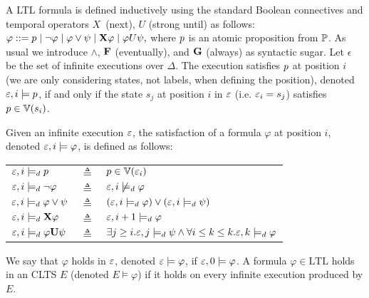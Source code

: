 

A LTL formula is defined inductively using the standard Boolean connectives and temporal operators $X$~(next), $U$ (strong until) as follows: 
$\varphi ::= {p} \mid \neg \varphi \mid \varphi \vee \psi \mid {\bf X} \varphi \mid \varphi U \psi,$
where ${p}$ is an atomic proposition from ${\mathbb{P}}$. 
As usual we introduce $\wedge$, ${\bf F}$ (eventually), and ${\bf G}$ (always) as syntactic sugar. 
Let $\epsilon$ be the set of infinite executions over $\Delta$.
The execution \executionDef satisfies ${p}$ at position $i$ (we are only considering states, not labels, when defining the position), denoted ${\varepsilon},i \models {p}$, if and only if the state $s_j$ at position $i$ in ${\varepsilon}$ (i.e. ${\varepsilon}_i = s_j$)  satisfies ${p} \in {\mathbb{V}}(s_i)$.


Given an infinite execution ${\varepsilon}$, the satisfaction of a formula $\varphi$ at position $i$, denoted ${\varepsilon},i\models\varphi$, is defined as follows:

\begin{tabular}{ l c l }
${\varepsilon}, i \models_d {p}$ & $\triangleq$ & ${p} \in {\mathbb{V}}({\varepsilon}_i)$\\
${\varepsilon}, i \models_d \neg \varphi$ & $\triangleq$ & ${\varepsilon}, i \not\models_d \varphi$\\
${\varepsilon}, i \models_d \varphi \vee \psi$ & $\triangleq$ & $({\varepsilon}, i \models_d \varphi) \vee ({\varepsilon}, i \models_d \psi)$\\
${\varepsilon}, i \models_d {\bf X} \varphi$ & $\triangleq$ & ${\varepsilon}, i +1 \models_d \varphi$\\
${\varepsilon}, i \models_d \varphi {\bf U} \psi$ & $\triangleq$ & $\exists j \geq i . {\varepsilon},j \models_d \psi \wedge \forall i \leq k \le k. {\varepsilon}, k \models_d \varphi$\\
\end{tabular}
  
We say that $\varphi$ holds in ${\varepsilon}$, denoted ${\varepsilon}\models\varphi$, if ${\varepsilon},0\models\varphi$. 
A formula $\varphi \in \mbox{LTL}$ holds in an CLTS $E$ (denoted $E \models \varphi$) if it holds on every infinite execution produced by $E$.
